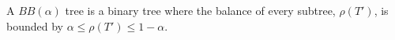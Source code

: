 \documentclass[12pt]{article}
\begin{document}
A \emph{$BB(\alpha)$} tree is a  binary tree where the balance of every subtree, $\rho(T')$, is bounded by
 $\alpha \le \rho(T') \le 1-\alpha$.
\end{document}
